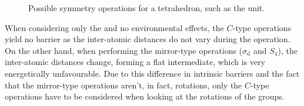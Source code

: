 \begin{figure}[h!]
  \begin{center}
\newline
    \parbox{0.85\linewidth}{
      \caption{Possible symmetry operations for a tetrahedron, such as the  unit.
      }
      \label{fig:symmetry}
    }
  \end{center}
\end{figure}

When considering only the  and no environmental effects, the $C$-type operations yield no barrier as the inter-atomic distances do not vary during the operation.
On the other hand, when performing the mirror-type operations ($\sigma_\text{d}$ and $S_4$), the inter-atomic distances change, forming a flat  intermediate, which is very energetically unfavourable.
Due to this difference in intrinsic barriers and the fact that the mirror-type operations aren't, in fact, rotations, only the $C$-type operations have to be considered when looking at the rotations of the  groups.

